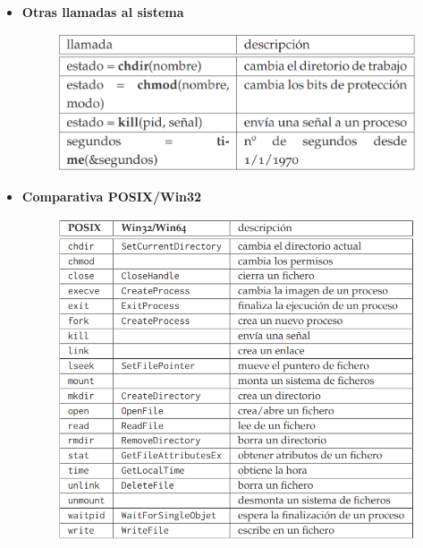 \documentclass{article}
\begin{document}
\begin{itemize}
\item \textbf{Otras llamadas al sistema}
\begin{figure}[h]
\centering
\includegraphics[scale=1, width=110mm]{llamadas_4.png}
\end{figure}

\item \textbf{Comparativa POSIX/Win32}
\begin{figure}[h]
\centering
\includegraphics[scale=1, width=110mm]{comparativa.png}
\end{figure}

\end{itemize}
\end{document}
